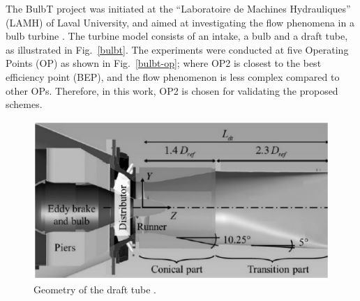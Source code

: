 The BulbT project was initiated at the ``Laboratoire de Machines Hydrauliques'' (LAMH) of Laval University, and aimed at investigating the flow phenomena in a bulb turbine \cite{vu2014cfd}. The turbine model consists of an intake, a bulb and a draft tube, as illustrated in Fig.~\ref{bulbt}. The experiments were conducted at five Operating Points (OP) as shown in Fig.~\ref{bulbt-op}; where OP2 is closest to the best efficiency point (BEP), and the flow phenomenon is less complex compared to other OPs. Therefore, in this work, OP2 is chosen for validating the proposed schemes.
\begin{figure}[t]  
\centering
     \includegraphics[clip=true, trim= 0.0cm 0.0cm 0.0cm 0.0cm,width=0.99\linewidth]{./figures/bulbt/drafttube}                            
     \caption{Geometry of the draft tube \cite{pereira2017flow}.}
     \label{drafttube}
\end{figure}

